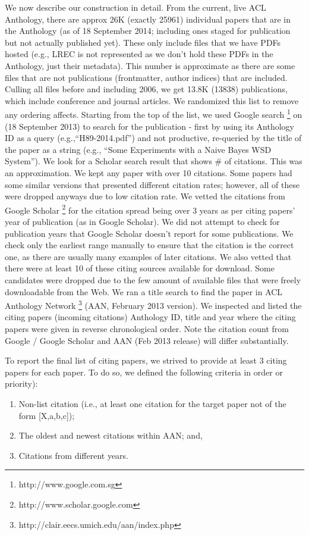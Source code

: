 \documentclass[11pt]{article}
\begin{document}
We now describe our construction in detail. From the current, live ACL
 Anthology, there are approx 26K (exactly 25961) individual papers that 
 are in the Anthology (as of 18 September 2014; including 
ones staged for publication but not actually published yet). These only include 
files that we have PDFs hosted (e.g., LREC is not represented as we don't hold 
these PDFs in the Anthology, just their metadata). This number is approximate 
as there are some files that are not publications (frontmatter, author 
indices) that are included. Culling all files before and including 2006, we get 
13.8K (13838) publications, which include conference and journal articles. We 
randomized this list to remove any ordering affects. Starting from the top of 
the list, we used Google search 
\footnote{http://www.google.com.sg}
on (18 September 2013) to search for the 
publication - first by using its Anthology ID as a query 
(e.g.,``H89-2014.pdf'') and not productive, re-queried by the title of the 
paper as a string (e.g., ``Some Experiments with a Naive Bayes WSD System'').
We look for a Scholar search result that shows \# of citations. This was an 
approximation. We kept any paper with over 10 citations. Some papers had 
some similar versions that presented different citation rates; however, 
all of these were dropped anyways due to low citation rate.
We vetted the citations from Google Scholar
\footnote{http://www.scholar.google.com}
 for the citation spread being over 3 years as per citing papers' year 
 of publication (as in Google Scholar). 
We did not attempt to check for publication years that Google Scholar doesn't 
report for some publications. We check only the earliest range manually to 
ensure that the citation is the correct one, as there are usually many examples 
of later citations. We also vetted that there were at least 10 of these citing 
sources available for download. Some candidates were dropped due to the few 
amount of available files that were freely downloadable from the Web.
We ran a title search to find the paper in ACL Anthology Network  
\footnote{http://clair.eecs.umich.edu/aan/index.php}
(AAN, February 2013 version). We inspected and listed the citing papers 
(incoming citations) Anthology ID, title and year where the citing papers 
were given in reverse chronological order. Note the citation count from 
Google / Google Scholar and AAN (Feb 2013 release) will differ substantially.

To report the final list of citing papers, we strived to provide at least 
3 citing papers for each paper. To do so, we defined the following criteria 
in order or priority):
\begin{enumerate}
\item Non-list citation (i.e., at least one citation for the
target paper not of the form [X,a,b,c]); 
\item The oldest and newest
citations within AAN; and, 
\item Citations from different years. 
\end{enumerate}
\end{document}
